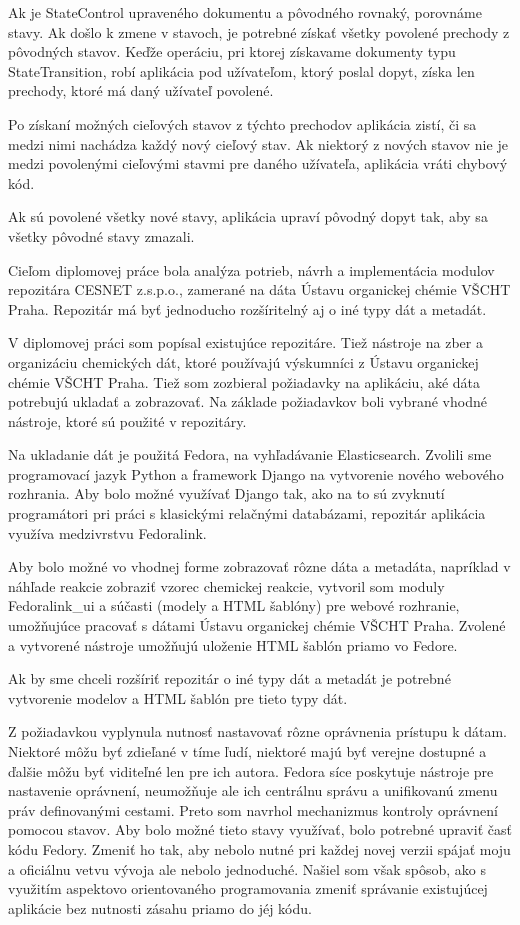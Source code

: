 \documentclass[thesis=M,slovak]{FITthesis}[2013/05/06]
\begin{document}
Ak je StateControl upraveného dokumentu a pôvodného rovnaký, porovnáme stavy. Ak došlo k zmene v stavoch, je potrebné získať všetky povolené prechody z pôvodných stavov. Keďže operáciu, pri ktorej získavame dokumenty typu StateTransition, robí aplikácia pod užívateľom, ktorý poslal dopyt, získa len prechody, ktoré má daný užívateľ povolené.

Po získaní možných cieľových stavov z týchto prechodov aplikácia zistí, či sa medzi nimi nachádza každý nový cieľový stav. Ak niektorý z nových stavov nie je medzi povolenými cieľovými stavmi pre daného užívateľa, aplikácia vráti chybový kód.

Ak sú povolené všetky nové stavy, aplikácia upraví pôvodný dopyt tak, aby sa všetky pôvodné stavy zmazali.

\begin{conclusion}
	Cieľom diplomovej práce bola analýza potrieb, návrh a implementácia modulov repozitára CESNET z.s.p.o., zamerané na dáta Ústavu organickej chémie VŠCHT Praha. Repozitár má byť jednoducho rozšíritelný aj o iné typy dát a metadát.

V diplomovej práci som popísal existujúce repozitáre. Tiež nástroje na zber a organizáciu chemických dát, ktoré používajú výskumníci z Ústavu organickej chémie VŠCHT Praha. Tiež som zozbieral požiadavky na aplikáciu, aké dáta potrebujú ukladať a zobrazovať. Na základe požiadavkov boli vybrané vhodné nástroje, ktoré sú použité v repozitáry.

Na ukladanie dát je použitá Fedora, na vyhľadávanie Elasticsearch. Zvolili sme programovací jazyk Python a framework Django na vytvorenie nového webového rozhrania. Aby bolo možné využívať Django tak, ako na to sú zvyknutí programátori pri práci s klasickými relačnými databázami, repozitár aplikácia využíva medzivrstvu Fedoralink.

Aby bolo možné vo vhodnej forme zobrazovať rôzne dáta a metadáta, napríklad v náhľade reakcie zobraziť vzorec chemickej reakcie, vytvoril som moduly Fedoralink\_ui a súčasti (modely a HTML šablóny) pre webové rozhranie, umožňujúce pracovať s dátami Ústavu organickej chémie VŠCHT Praha. Zvolené a vytvorené nástroje umožňujú uloženie HTML šablón priamo vo Fedore.

Ak by sme chceli rozšíriť repozitár o iné typy dát a metadát je potrebné vytvorenie modelov a HTML šablón pre tieto typy dát.

Z požiadavkou vyplynula nutnosť nastavovať rôzne oprávnenia prístupu k dátam. Niektoré môžu byť zdieľané v tíme ľudí, niektoré majú byť verejne dostupné a ďalšie môžu byť viditeľné len pre ich autora. Fedora síce poskytuje nástroje pre nastavenie oprávnení, neumožňuje ale ich centrálnu správu a unifikovanú zmenu práv definovanými cestami. Preto som navrhol mechanizmus kontroly oprávnení pomocou stavov. Aby bolo možné tieto stavy využívať, bolo potrebné upraviť časť kódu Fedory. Zmeniť ho tak, aby nebolo nutné pri každej novej verzii spájať moju a oficiálnu vetvu vývoja ale nebolo jednoduché. Našiel som však spôsob, ako s využitím aspektovo orientovaného programovania zmeniť správanie existujúcej aplikácie bez nutnosti zásahu priamo do jéj kódu.


\end{conclusion}
\end{document}
